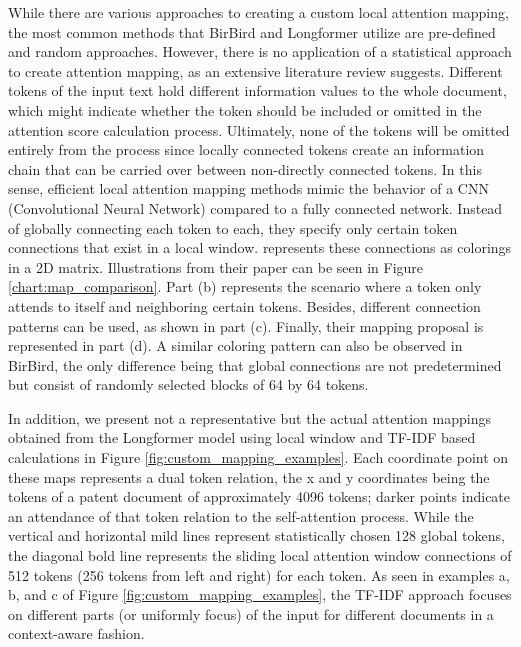 \documentclass{iyte}
\begin{document}
While there are various approaches to creating a custom local attention mapping, the most common methods that BirBird and Longformer utilize are pre-defined and random approaches. However, there is no application of a statistical approach to create attention mapping, as an extensive literature review suggests. Different tokens of the input text hold different information values to the whole document, which might indicate whether the token should be included or omitted in the attention score calculation process. Ultimately, none of the tokens will be omitted entirely from the process since locally connected tokens create an information chain that can be carried over between non-directly connected tokens. In this sense, efficient local attention mapping methods mimic the behavior of a CNN (Convolutional Neural Network) compared to a fully connected network. Instead of globally connecting each token to each, they specify only certain token connections that exist in a local window. \cite{longformer} represents these connections as colorings in a 2D matrix. Illustrations from their paper can be seen in Figure \ref{chart:map_comparison}. Part (b) represents the scenario where a token only attends to itself and neighboring certain tokens. Besides, different connection patterns can be used, as shown in part (c). Finally, their mapping proposal is represented in part (d). A similar coloring pattern can also be observed in BirBird, the only difference being that global connections are not predetermined but consist of randomly selected blocks of 64 by 64 tokens.



In addition, we present not a representative but the actual attention mappings obtained from the Longformer model using local window and TF-IDF based calculations in Figure \ref{fig:custom_mapping_examples}. Each coordinate point on these maps represents a dual token relation, the x and y coordinates being the tokens of a patent document of approximately 4096 tokens; darker points indicate an attendance of that token relation to the self-attention process. While the vertical and horizontal mild lines represent statistically chosen 128 global tokens, the diagonal bold line represents the sliding local attention window connections of 512 tokens (256 tokens from left and right) for each token. As seen in examples a, b, and c of Figure \ref{fig:custom_mapping_examples}, the TF-IDF approach focuses on different parts (or uniformly focus) of the input for different documents in a context-aware fashion.
\end{document}
